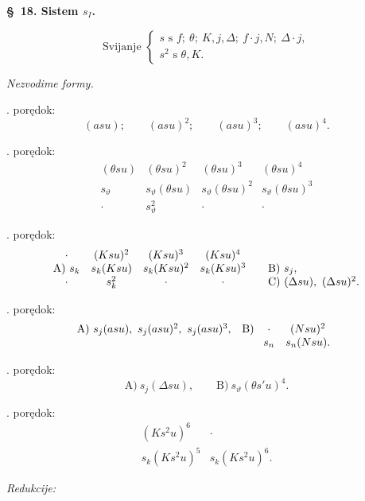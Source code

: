 \documentclass[11pt]{article}
\begin{document}
\begin{center}
\textbf{\S\ 18. \quad Sistem $s_I$.}
\end{center}

\[
\text{Svijanje }\left\{\begin{array}{l}
s\text{ s } f;\ \theta;\ K,j,\Delta;\ f\cdot j,N;\ \Delta\cdot j,\\
s^2\text{ s }\theta,K.
\end{array}\right.
\]

\noindent\textit{Nezvodime formy.}

. porędok:
\[
(asu);\qquad (asu)^2;\qquad (asu)^3;\qquad (asu)^4.
\]

. porędok:
\[
\begin{array}{cccc}
(\theta su)&(\theta su)^2&(\theta su)^3&(\theta su)^4\\
s_\vartheta&s_\vartheta(\theta su)&s_\vartheta(\theta su)^2&s_\vartheta(\theta su)^3\\
\cdot&s_\vartheta^2&\cdot&\cdot
\end{array}
\]

. porędok:
\[
\begin{array}{c@{\quad}c@{\quad}c@{\quad}c@{\qquad}l}
\cdot&(Ksu)^2&(Ksu)^3&(Ksu)^4&\\
\text{A)}\ s_k&s_k(Ksu)&s_k(Ksu)^2&s_k(Ksu)^3&
\text{B)}\ s_j,\\
\cdot&s_k^2&\cdot&\cdot&
\text{C)}\ (\Delta su),\ (\Delta su)^2.
\end{array}
\]

. porędok:
\[
\begin{array}{ll}
\text{A)}\ s_j(asu),\ s_j(asu)^2,\ s_j(asu)^3,
&
\text{B)}\ \begin{array}[t]{cc}
\cdot&(Nsu)^2\\
s_n&s_n(Nsu).
\end{array}
\end{array}
\]

. porędok:
\[
\text{A)}\ s_j(\Delta su),\qquad \text{B)}\ s_\vartheta(\theta s'u)^4.
\]

. porędok:
\[
\begin{array}{cc}
(Ks^2u)^6&\cdot\\
s_k(Ks^2u)^5&s_k(Ks^2u)^6.
\end{array}
\]

\noindent\textit{Redukcije:}
\end{document}
